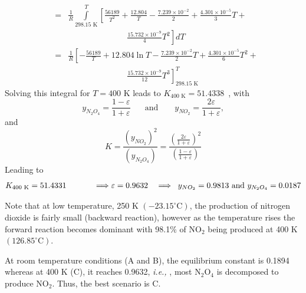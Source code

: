 \documentclass[calculator,allquestions,datasheet,mock,solutions]{exam_newMarcus2}
\newcommand{\frc}{\displaystyle\frac}
\newcommand{\ie}{{\it i.e., }}
\begin{document}
\begin{question}
\begin{enumerate}[a)]
{\begin{enumerate}[A.]
\begin{eqnarray}
                                                &=& \frc{1}{R}\int\limits_{298.15\text{ K}}^{T} \left[\frc{56189}{T^{2}} + \frc{12.804}{T} - \frc{7.239\times 10^{-2}}{2} + \frc{4.301\times 10^{-5}}{3}T + \right. \nonumber \\
                                                 && \hspace{3cm}\left.\frc{15.732\times 10^{-9}}{4}T^{2}\right]dT \nonumber \\
                                                &=& \frc{1}{R}\left[-\frc{56189}{T} + 12.804\ln{T} - \frc{7.239\times 10^{-2}}{2}T + \frc{4.301\times 10^{-5}}{6}T^{2} + \right. \nonumber \\
                                                &&\hspace{3cm}\left.\frc{15.732\times 10^{-9}}{12}T^{3}\right]_{298.15\text{ K}}^{T} \nonumber
\end{eqnarray}
Solving this integral for $T=400$ K leads to $K_{400\text{ K}} = 51.4338$~, with
         \begin{displaymath}
            y_{N_{2}O_{4}} = \frc{1-\varepsilon}{1+\varepsilon}\;\;\;\;\;\text{ and }\;\;\;\;\;\; y_{NO_{2}} = \frc{2\varepsilon}{1+\varepsilon},
         \end{displaymath}
         and
         \begin{displaymath}
             K = \frac{\left(y_{NO_{2}}\right)^{2}}{\left(y_{N_{2}O_{4}}\right)} = \frc{\left(\frc{2\varepsilon}{1+\varepsilon}\right)^{2}}{\left(\frc{1-\varepsilon}{1+\varepsilon}\right)}
         \end{displaymath}
         Leading to~
         \begin{displaymath}
             K_{400\text{ K}}   = 51.4331 \hspace{1.2cm} \Longrightarrow \varepsilon = 0.9632  \hspace{.35cm} \Longrightarrow \;\;  y_{NO_{2}} = 0.9813 \text{ and } y_{N_{2}O_{4}} = 0.0187
         \end{displaymath}
         
        Note that at low temperature, 250 K $\left(-23.15^{\circ}\text{C}\right)$, the production of nitrogen dioxide is fairly small (backward reaction), however as the temperature rises the forward reaction becomes dominant with 98.1$\%$ of NO$_{2}$ being produced at 400 K$\left(126.85^{\circ}\text{C}\right)$.

           \end{enumerate} 
         At room temperature conditions (A and B), the equilibrium constant is 0.1894 whereas at 400 K (C), it reaches 0.9632, \ie, most N$_{2}$O$_{4}$ is decomposed to produce NO$_{2}$. Thus, the best scenario is C.~
             }
          

\end{enumerate}
\end{question}
\end{document}
